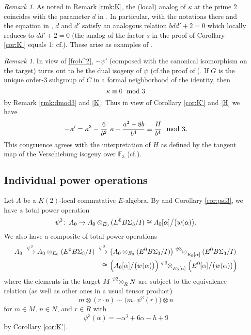 \documentclass{gtpart}
\theoremstyle{definition}
\theoremstyle{remark}
\newtheorem{rmk}[thm]{Remark}
\def\co{\colon\thinspace}
\newcommand{\mb}[1]{\mathbb{#1}}
\newcommand{\cf}{cf.\thinspace}
\newcommand{\BF}{{\mb F}}
\newcommand{\md}{~~{\rm mod}~}
\newcommand{\A}{\alpha}
\newcommand{\K}{\kappa}
\newcommand{\p}{\psi^3}
\begin{document}
\begin{rmk}
\label{rmk:KK'}
 As noted in Remark \ref{rmk:K}, the (local) analog of $\K$ at the prime 2 coincides with the parameter $d$ in \cite[Section 3]{h2p2}.  
 In particular, with the notations there and the equation in \cite[Proposition 3.2]{tmf3}, 
 $d$ and $d'$ satisfy an analogous relation $b d d' + 2 = 0$ which locally reduces to $d d' + 2 = 0$ 
 (the analog of the factor $s$ in the proof of Corollary \ref{cor:K'} equals 1; \cf \cite[Theorem 2.5.7]{andoduke}).  
 These arise as examples of \cite[Lemma 3.21]{poonen}.  
\end{rmk}

\begin{rmk}
\label{rmk:K'}
 In view of \eqref{frob^2}, $-\psi'$ (composed with the canonical isomorphism on the target) 
 turns out to be the dual isogeny of $\psi$ (\cf the proof of \cite[2.9.4]{KM}).  
 If $G$ is the unique order-3 subgroup of $C$ in a formal neighborhood of the identity, 
 then 
 \[
  \K \equiv 0 \md 3 
 \]
 by Remark \ref{rmk:dmod3} and \eqref{K}.  
 Thus in view of Corollary \ref{cor:K'} and \eqref{H} we have 
 \[
  -\K' = \K^3 - \frac{6}{b^2} ~ \K + \frac{a^2 - 8 b}{b^4} \equiv \frac{H}{b^4} \md 3.  
 \]
 This congruence agrees with the interpretation of $H$ as defined by the tangent map of the Verschiebung isogeny over $\BF_3$ (\cf \cite[12.4.1]{KM}).  
\end{rmk}


\subsection{Individual power operations}

Let $A$ be a $K(2)$-local commutative $E$-algebra.  
By \cite[3.23]{cong} and Corollary \ref{cor:psi3}, 
we have a total power operation 
\[
 \p \co A_0 \to A_0 \otimes_{E_0} (E^0 B\Sigma_3 / I) \cong A_0 [\A] \big/ \big( w(\A) \big).  
\]
We also have a composite of total power operations 
\begin{equation}
\label{psi3^2}
\begin{split}
 A_0 \stackrel{\p}{\longrightarrow} A_0 \otimes_{E_0} (E^0 B\Sigma_3 / I) \stackrel{\p}{\longrightarrow} 
 & ~ \big( A_0 \otimes_{E_0} (E^0 B\Sigma_3 / I) \big) \tensor[^\p]{\otimes}{_{E_0 [\A]}} (E^0 B\Sigma_3 / I) \\
 \cong & ~ \Big( A_0 [\A] \big/ \big( w(\A) \big) \Big) \tensor[^\p]{\otimes}{_{E_0 [\A]}} \Big( E^0 [\A] \big/ \big( w(\A) \big) \Big) 
\end{split}
\end{equation}
where the elements in the target $M \tensor[^\p]{\otimes}{_R} N$ are subject to the equivalence relation (as well as other ones in a usual tensor product) 
\[
 m \otimes (r \cdot n) \sim \big( m \cdot \p(r) \big) \otimes n 
\]
for $m \in M$, $n \in N$, and $r \in R$ with 
\[
 \p(\A) = -\A^3 + 6 \A - h + 9 
\]
by Corollary \ref{cor:K'}.  
\end{document}
